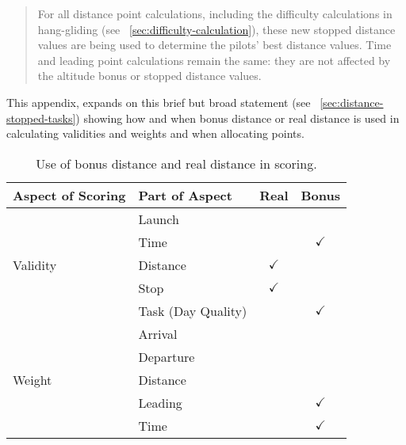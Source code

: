 \documentclass[gap.tex]{subfiles}
\begin{document}
\label{sec:bonus-distance-use}

\begin{quote}
    For all distance point calculations, including the difficulty calculations
    in hang-gliding (see ~\ref{sec:difficulty-calculation}), these new stopped
    distance values are being used to determine the pilots’ best distance
    values.  Time and leading point calculations remain the same: they are not
    affected by the altitude bonus or stopped distance values. 
\end{quote}

This appendix, expands on this brief but broad statement (see
~\ref{sec:distance-stopped-tasks}) showing how and when bonus distance or real
distance is used in calculating validities and weights and when allocating
points.

\begin{table}[!ht]
    \begin{tabularx}{\textwidth}{|l|X|c|c|}
    \hline
        \textbf{Aspect of Scoring}
        & \textbf{Part of Aspect}
        & \textbf{Real}
        & \textbf{Bonus}
        \\
    \hline
        \multirow{5}{*}{Validity}
        & Launch
        &
        &
        \\
    \cline{2-4}
        & Time
        &
        & $\checkmark$
        \\
    \cline{2-4}
        & Distance
        & $\checkmark$
        &
        \\
    \cline{2-4}
        & Stop
        & $\checkmark$
        &
        \\
    \cline{2-4}
        & Task (Day Quality)
        &
        & $\checkmark$
        \\
    \hline
        \multirow{5}{*}{Weight}
        & Arrival
        &
        &
        \\
    \cline{2-4}
        & Departure
        &
        &
        \\
    \cline{2-4}
        & Distance
        &
        &
        \\
    \cline{2-4}
        & Leading
        &
        & $\checkmark$
        \\
    \cline{2-4}
        & Time
        &
        & $\checkmark$
        \\
    \hline
    \end{tabularx}
    \caption{Use of bonus distance and real distance in scoring.}
    \label{tab:gap-defaults}
\end{table}
\end{document}
